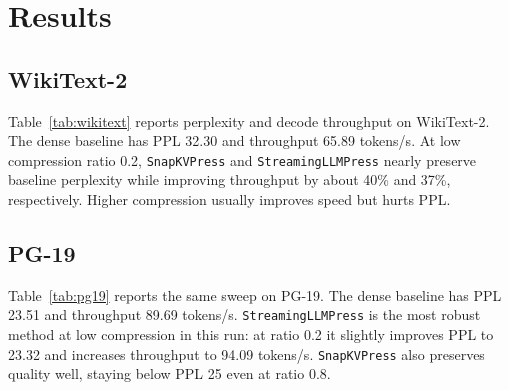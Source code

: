 \documentclass{article}
\begin{document}
\section{Results}

\subsection{WikiText-2}

Table~\ref{tab:wikitext} reports perplexity and decode throughput on WikiText-2.
The dense baseline has PPL 32.30 and throughput 65.89 tokens/s. At low
compression ratio 0.2, \texttt{SnapKVPress} and \texttt{StreamingLLMPress}
nearly preserve baseline perplexity while improving throughput by about 40\% and
37\%, respectively. Higher compression usually improves speed but hurts PPL.

\begin{table}[t]
\centering
\caption{WikiText-2 CPU results. PPL is lower better; throughput is higher better.}
\label{tab:wikitext}
\end{table}

\subsection{PG-19}

Table~\ref{tab:pg19} reports the same sweep on PG-19. The dense baseline has
PPL 23.51 and throughput 89.69 tokens/s. \texttt{StreamingLLMPress} is the most
robust method at low compression in this run: at ratio 0.2 it slightly improves
PPL to 23.32 and increases throughput to 94.09 tokens/s. \texttt{SnapKVPress}
also preserves quality well, staying below PPL 25 even at ratio 0.8.
\end{document}
